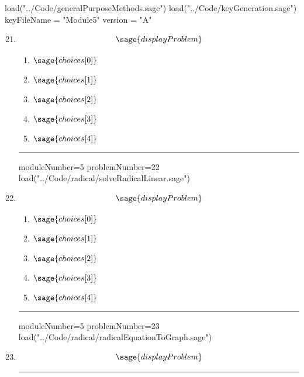 \documentclass[14pt]{article}
\newcommand{\litem}[1]{\item#1\hspace*{-1cm}\rule{\textwidth}{0.4pt}}
\begin{document}
\pagestyle{fancy}

\begin{sagesilent}
load("../Code/generalPurposeMethods.sage")
load("../Code/keyGeneration.sage")
keyFileName = "Module5"
version = "A"
\end{sagesilent}

\begin{enumerate}
\setcounter{enumi}{20}


\begin{sagesilent}
moduleNumber=5
problemNumber=21
load("../Code/radical/domainRadical.sage")
\end{sagesilent}

\litem{ 

	\[ \sage{displayProblem} \]
	\begin{enumerate}[label=\Alph*.]
		\item \( \sage{choices[0]} \)
		\item \( \sage{choices[1]} \)
		\item \( \sage{choices[2]} \)
		\item \( \sage{choices[3]} \)
		\item \( \sage{choices[4]} \)
	\end{enumerate}
}

\begin{sagesilent}
moduleNumber=5
problemNumber=22
load("../Code/radical/solveRadicalLinear.sage")
\end{sagesilent}

\litem{

\[ \sage{displayProblem} \]

	\begin{enumerate}[label=\Alph*.]
		\item \( \sage{choices[0]} \)
		\item \( \sage{choices[1]} \)
		\item \( \sage{choices[2]} \)
		\item \( \sage{choices[3]} \)
		\item \( \sage{choices[4]} \)
	\end{enumerate}
}

\begin{sagesilent}
moduleNumber=5
problemNumber=23
load("../Code/radical/radicalEquationToGraph.sage")
\end{sagesilent}

\litem{

\[ \sage{displayProblem} \]

}
\end{enumerate}
\end{document}
